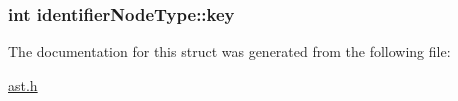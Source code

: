 \subsubsection[{\texorpdfstring{key}{key}}]{\setlength{\rightskip}{0pt plus 5cm}int identifier\+Node\+Type\+::key}\hypertarget{structidentifierNodeType_af46293c8242bffa382258675b7401572}{}\label{structidentifierNodeType_af46293c8242bffa382258675b7401572}


The documentation for this struct was generated from the following file\+:\begin{DoxyCompactItemize}
\item 
\hyperlink{ast_8h}{ast.\+h}\end{DoxyCompactItemize}
